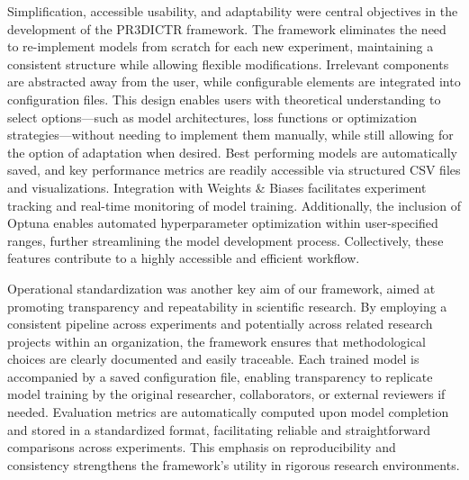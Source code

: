 \documentclass[11pt]{article}
\begin{document}
Simplification, accessible usability, and adaptability were central objectives in the development of the PR3DICTR framework. The framework eliminates the need to re-implement models from scratch for each new experiment, maintaining a consistent structure while allowing flexible modifications. Irrelevant components are abstracted away from the user, while configurable elements are integrated into configuration files. This design enables users with theoretical understanding to select options---such as model architectures, loss functions or optimization strategies---without needing to implement them manually, while still allowing for the option of adaptation when desired. Best performing models are automatically saved, and key performance metrics are readily accessible via structured CSV files and visualizations. Integration with Weights \& Biases facilitates experiment tracking and real-time monitoring of model training. Additionally, the inclusion of Optuna enables automated hyperparameter optimization within user-specified ranges, further streamlining the model development process. Collectively, these features contribute to a highly accessible and efficient workflow.

Operational standardization was another key aim of our framework, aimed at promoting transparency and repeatability in scientific research. By employing a consistent pipeline across experiments and potentially across related research projects within an organization, the framework ensures that methodological choices are clearly documented and easily traceable. Each trained model is accompanied by a saved configuration file, enabling transparency to replicate model training by the original researcher, collaborators, or external reviewers if needed. Evaluation metrics are automatically computed upon model completion and stored in a standardized format, facilitating reliable and straightforward comparisons across experiments. This emphasis on reproducibility and consistency strengthens the framework's utility in rigorous research environments.
\end{document}
